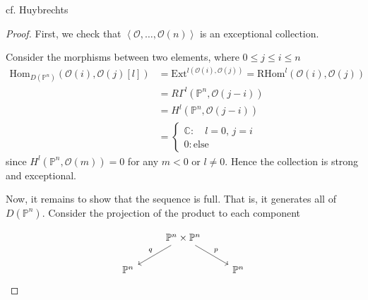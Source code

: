 cf. Huybrechts
\begin{proof}

First, we check that $\left< \mathcal{O}, \dots, \mathcal{O} (n) \right>$ is an exceptional collection. 

Consider the morphisms between two elements, where $0\leq j\leq i \leq n$ $$
\begin{align}
\text{Hom}_{D(\mathbb{P}^{n})} (\mathcal{O}(i),\mathcal{O}(j)[l]) &= \text{Ext}^{l(\mathcal{O}(i),\mathcal{O}(j))}= \text{RHom}^{l}(\mathcal{O}(i),\mathcal{O}(j)) \\ 
&= R\Gamma^{l}(\mathbb{P}^{n},\mathcal{O}(j-i))  \\
&= H^{l}(\mathbb{P}^{n},\mathcal{O}(j-i)) \\
&= \begin{cases}
\mathbb{C} :\quad l=0, \,j=i \\
0 : \text{else}
\end{cases}
\end{align}
$$
since $H^{l}(\mathbb{P}^{n}, \mathcal{O}(m))=0$ for any $m<0$ or $l \neq 0$. Hence the collection is strong and exceptional. 

Now, it remains to show that the sequence is full. That is, it generates all of $D(\mathbb{P}^{n})$.  Consider the projection of the product to each component 

\[\begin{tikzcd}
	& {\mathbb P^n \times \mathbb P^n} \\
	{\mathbb P^n} && {\mathbb P^n}
	\arrow["q"', from=1-2, to=2-1]
	\arrow["p", from=1-2, to=2-3]
\end{tikzcd}\]


\end{proof}

